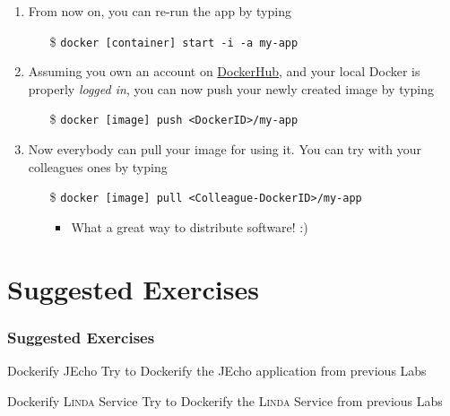 \documentclass{beamer}\mode<presentation>{\usetheme{AMSBolognaFC}}
\begin{document}
\begin{frame}[allowframebreaks]
\begin{enumerate}
        \framebreak

        \item From now on, you can re-run the app by typing
        \begin{itemize}
            \item[\$] \texttt{docker [container] \alert{start} -i -a my-app}
        \end{itemize}

        \item Assuming you own an account on \href{https://hub.docker.com/}{DockerHub}, and your local Docker is properly \emph{logged in}, you can now \alert{push} your newly created image by typing
        \begin{itemize}
            \item[\$] \texttt{docker [image] \alert{push} <DockerID>/my-app}
        \end{itemize}

        \item Now everybody can \alert{pull} your image for using it. You can try with your colleagues ones by typing
        \begin{itemize}
            \item[\$] \texttt{docker [image] \alert{pull} <Colleague-DockerID>/my-app}
            \begin{itemize}
                \item What a great way to distribute software! :)
            \end{itemize}
        \end{itemize}

    \end{enumerate}

\end{frame}

\section{Suggested Exercises}

\begin{frame}%
\frametitle{Suggested Exercises}

\begin{block}{Dockerify JEcho}
    Try to Dockerify the JEcho application from previous Labs
\end{block}

\vfill{}

\begin{block}{Dockerify \textsc{Linda} Service}
    Try to Dockerify the \textsc{Linda} Service from previous Labs
\end{block}

\end{frame}
\end{document}
